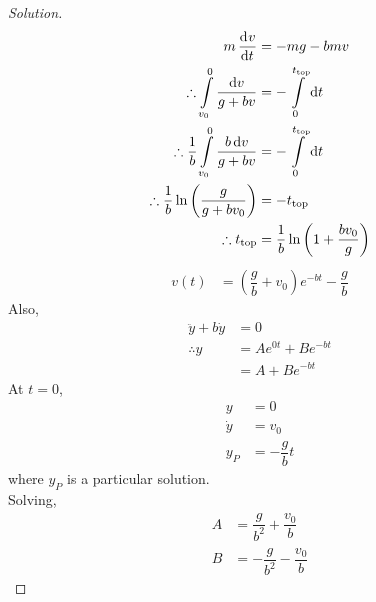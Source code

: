 \documentclass[fleqn, a4paper, 12pt, draft]{article}
\theoremstyle{definition}
\theoremstyle{theorem}
\newenvironment{solution}
{\begin{proof}[Solution]\let\qed\relax}
	{\end{proof}}
\begin{document}
\begin{solution}
	\begin{align*}
		m \dod {v}{t} &= - m g - b m v\\
		\therefore \int\limits_{v_0}^{0} \dfrac{\dif v}{g + b v} &= -\int\limits_{0}^{t_{\text{top}}} \dif t\\
		\therefore \dfrac{1}{b} \int\limits_{v_0}^{0} \dfrac{b \dif v}{g + b v} &= -\int\limits_{0}^{t_{\text{top}}} \dif t\\
		\therefore \dfrac{1}{b} \ln \left( \dfrac{g}{g + b v_0} \right) &= - t_{\text{top}}\\
		\therefore t_{\text{top}} &= \dfrac{1}{b} \ln \left( 1 + \dfrac{b v_0}{g} \right)
	\end{align*}
	\begin{align*}
		v(t) &= \left( \dfrac{g}{b} + v_0 \right) e^{-bt} - \dfrac{g}{b}
	\end{align*}
	Also,
	\begin{align*}
		\ddot{y} + b \dot{y} &= 0\\
		\therefore y &= A e^{0 t} + B e^{-b t}\\
		&= A + B e^{-b t}
	\end{align*}
	At $t = 0$,
	\begin{align*}
		y &= 0\\
		\dot{y} &= v_0\\
		y_P &= -\dfrac{g}{b} t
	\end{align*}
	where $y_P$ is a particular solution.\\
	Solving, 
	\begin{align*}
		A &= \dfrac{g}{b^2} + \dfrac{v_0}{b}\\
		B &= - \dfrac{g}{b^2} - \dfrac{v_0}{b}
	\end{align*}
\end{solution}
\end{document}
